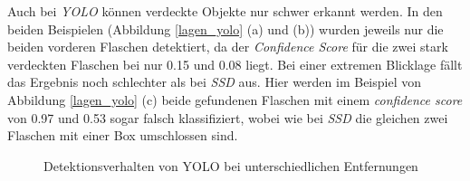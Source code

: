 Auch bei \textit{YOLO} können verdeckte Objekte nur schwer erkannt werden. In den beiden Beispielen (Abbildung \ref{lagen_yolo} (a) und (b)) wurden jeweils nur die beiden vorderen Flaschen detektiert, da der \textit{Confidence Score} für die zwei stark verdeckten Flaschen bei nur 0.15 und 0.08 liegt. Bei einer extremen Blicklage fällt das Ergebnis noch schlechter als bei \textit{SSD} aus. Hier werden im Beispiel von Abbildung \ref{lagen_yolo} (c) beide gefundenen Flaschen mit einem \textit{confidence score} von 0.97 und 0.53 sogar falsch klassifiziert, wobei wie bei \textit{SSD} die gleichen zwei Flaschen mit einer Box umschlossen sind.

\begin{figure}[H]
	\hfill
	\hfill
	\hfill
	\hfill
	\caption{Detektionsverhalten von YOLO bei unterschiedlichen Entfernungen}
	\label{entfernung_yolo}
\end{figure}

